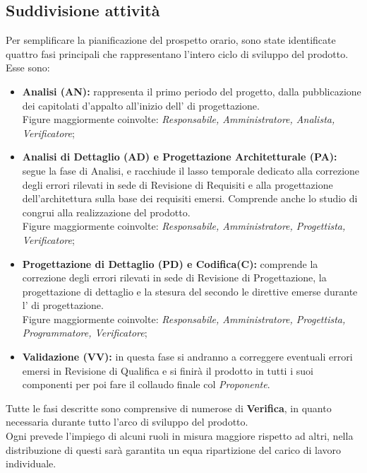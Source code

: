 \documentclass{scalatekids-article}
\begin{document}
\subsection{Suddivisione attività}
\label{sub:fasi}
Per semplificare la pianificazione del prospetto orario, sono state identificate
quattro fasi principali che rappresentano l'intero ciclo di sviluppo del prodotto.\\
Esse sono:
\begin{itemize}
\item\textbf{Analisi (AN):} rappresenta il primo periodo del progetto,
dalla
  pubblicazione dei capitolati d'appalto all'inizio dell' di progettazione.\\
  Figure maggiormente coinvolte: \textit{Responsabile, Amministratore, Analista, Verificatore};
\item\textbf{Analisi di Dettaglio (AD) e Progettazione Architetturale (PA):} segue la fase di Analisi, e
  racchiude il lasso temporale dedicato alla correzione degli errori rilevati in
  sede di Revisione di Requisiti e alla progettazione dell'architettura sulla
  base dei requisiti emersi. Comprende anche lo studio di 
  congrui alla realizzazione del prodotto.\\ Figure maggiormente coinvolte:
  \textit{Responsabile, Amministratore, Progettista, Verificatore};
\item\textbf{Progettazione di Dettaglio (PD) e Codifica(C):} comprende la correzione degli errori rilevati in sede di Revisione di Progettazione, la progettazione di dettaglio e la stesura del  secondo le direttive emerse durante l' di progettazione.\\Figure maggiormente coinvolte:
  \textit{Responsabile, Amministratore, Progettista, Programmatore, Verificatore};
\item\textbf{Validazione (VV):} in questa fase si andranno a correggere eventuali errori emersi in Revisione di Qualifica e si finirà il prodotto in tutti i suoi componenti per poi fare il collaudo finale col \textit{Proponente}.
\end{itemize}
Tutte le fasi descritte sono comprensive di numerose  di \textbf{Verifica}, in quanto necessaria durante tutto l'arco di sviluppo del prodotto.\\Ogni {} prevede l'impiego di alcuni ruoli in misura maggiore rispetto ad altri, nella distribuzione di questi sarà garantita un equa ripartizione del
carico di lavoro individuale.\\
\end{document}

